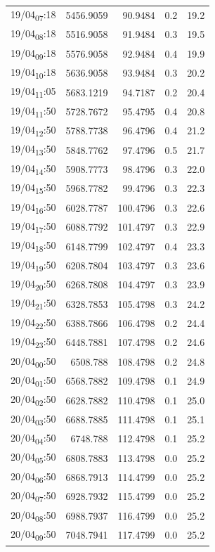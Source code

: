 \documentclass[11pt]{article}
\begin{document}
\begin{center}
\begin{tabular}{lrrrr}
19/04\textsubscript{07}:18 & 5456.9059 & 90.9484 & 0.2 & 19.2\\[0pt]
19/04\textsubscript{08}:18 & 5516.9058 & 91.9484 & 0.3 & 19.5\\[0pt]
19/04\textsubscript{09}:18 & 5576.9058 & 92.9484 & 0.4 & 19.9\\[0pt]
19/04\textsubscript{10}:18 & 5636.9058 & 93.9484 & 0.3 & 20.2\\[0pt]
19/04\textsubscript{11}:05 & 5683.1219 & 94.7187 & 0.2 & 20.4\\[0pt]
19/04\textsubscript{11}:50 & 5728.7672 & 95.4795 & 0.4 & 20.8\\[0pt]
19/04\textsubscript{12}:50 & 5788.7738 & 96.4796 & 0.4 & 21.2\\[0pt]
19/04\textsubscript{13}:50 & 5848.7762 & 97.4796 & 0.5 & 21.7\\[0pt]
19/04\textsubscript{14}:50 & 5908.7773 & 98.4796 & 0.3 & 22.0\\[0pt]
19/04\textsubscript{15}:50 & 5968.7782 & 99.4796 & 0.3 & 22.3\\[0pt]
19/04\textsubscript{16}:50 & 6028.7787 & 100.4796 & 0.3 & 22.6\\[0pt]
19/04\textsubscript{17}:50 & 6088.7792 & 101.4797 & 0.3 & 22.9\\[0pt]
19/04\textsubscript{18}:50 & 6148.7799 & 102.4797 & 0.4 & 23.3\\[0pt]
19/04\textsubscript{19}:50 & 6208.7804 & 103.4797 & 0.3 & 23.6\\[0pt]
19/04\textsubscript{20}:50 & 6268.7808 & 104.4797 & 0.3 & 23.9\\[0pt]
19/04\textsubscript{21}:50 & 6328.7853 & 105.4798 & 0.3 & 24.2\\[0pt]
19/04\textsubscript{22}:50 & 6388.7866 & 106.4798 & 0.2 & 24.4\\[0pt]
19/04\textsubscript{23}:50 & 6448.7881 & 107.4798 & 0.2 & 24.6\\[0pt]
20/04\textsubscript{00}:50 & 6508.788 & 108.4798 & 0.2 & 24.8\\[0pt]
20/04\textsubscript{01}:50 & 6568.7882 & 109.4798 & 0.1 & 24.9\\[0pt]
20/04\textsubscript{02}:50 & 6628.7882 & 110.4798 & 0.1 & 25.0\\[0pt]
20/04\textsubscript{03}:50 & 6688.7885 & 111.4798 & 0.1 & 25.1\\[0pt]
20/04\textsubscript{04}:50 & 6748.788 & 112.4798 & 0.1 & 25.2\\[0pt]
20/04\textsubscript{05}:50 & 6808.7883 & 113.4798 & 0.0 & 25.2\\[0pt]
20/04\textsubscript{06}:50 & 6868.7913 & 114.4799 & 0.0 & 25.2\\[0pt]
20/04\textsubscript{07}:50 & 6928.7932 & 115.4799 & 0.0 & 25.2\\[0pt]
20/04\textsubscript{08}:50 & 6988.7937 & 116.4799 & 0.0 & 25.2\\[0pt]
20/04\textsubscript{09}:50 & 7048.7941 & 117.4799 & 0.0 & 25.2\\[0pt]
\end{tabular}
\end{center}
\end{document}
